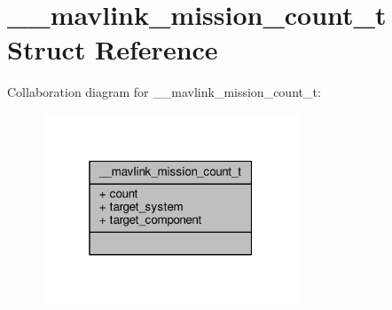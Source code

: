 \hypertarget{struct____mavlink__mission__count__t}{\section{\+\_\+\+\_\+mavlink\+\_\+mission\+\_\+count\+\_\+t Struct Reference}
\label{struct____mavlink__mission__count__t}
}


Collaboration diagram for \+\_\+\+\_\+mavlink\+\_\+mission\+\_\+count\+\_\+t\+:
\nopagebreak
\begin{figure}[H]
\begin{center}
\leavevmode
\includegraphics[width=217pt]{struct____mavlink__mission__count__t__coll__graph}
\end{center}
\end{figure}

